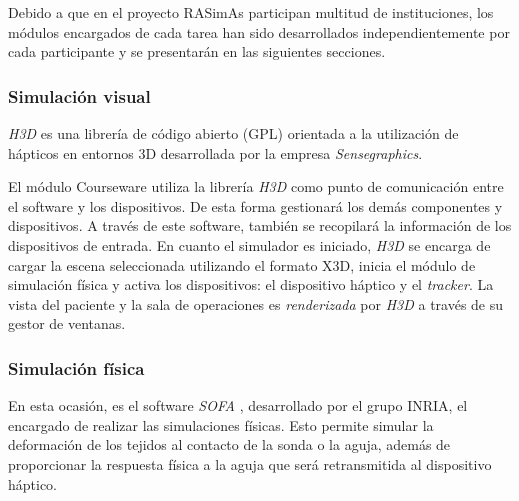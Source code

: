 
Debido a que en el proyecto \ac{RASimAs} participan multitud de instituciones, los módulos encargados de cada tarea han sido desarrollados independientemente por cada participante y se presentarán en las siguientes secciones.


\subsubsection{Simulación visual}

\emph{H3D} \cite{sensegraphics2012open} es una librería de código abierto (\ac{GPL})  orientada a la utilización de hápticos en entornos 3D desarrollada por la empresa \emph{Sensegraphics}. 

El módulo \ac{Courseware} utiliza la librería \emph{H3D} como punto de comunicación entre el software y los dispositivos. De esta forma gestionará los demás componentes y dispositivos. A través de este software, también se recopilará la información de los dispositivos de entrada.
En cuanto el simulador es iniciado, \emph{H3D} se encarga de cargar la escena seleccionada utilizando el formato \ac{X3D}, inicia el módulo de simulación física y activa los dispositivos:  el dispositivo háptico y el \emph{\acs{tracker}}. La vista del paciente y la sala de operaciones es \emph{renderizada} por \emph{H3D} a través de su gestor de ventanas.

\subsubsection{Simulación física}

En esta ocasión, es el software \emph{SOFA} \cite{sofaweb}, desarrollado por el grupo \ac{INRIA}, el encargado de realizar las simulaciones físicas. Esto permite simular la deformación de los tejidos al contacto de la sonda o la aguja, además de proporcionar la respuesta física a la aguja que será retransmitida al dispositivo háptico.

